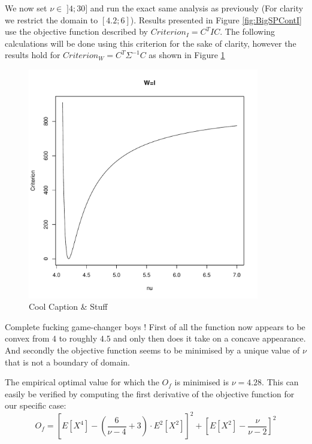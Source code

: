 We now set $\nu \in \; ]4;30]$ and run the exact same analysis as previously (For clarity we restrict the domain to $[4.2;6]$). Results presented in Figure \ref{fig:BigSPContI} use the objective function described by $Criterion_I = C^T I C$. The following calculations will be done using this criterion for the sake of clarity, however the results hold for $Criterion_W = C^T \Sigma^{-1} C$ as shown in Figure \ref{ConcavitySPI} \bigskip
\begin{figure}
    \centering
    \includegraphics[width=0.9\textwidth]{ConcavityS&PI.pdf}
    \caption{Cool Caption \& Stuff}
    \label{ConcavitySPI}
\end{figure}
\par
Complete fucking game-changer boys ! First of all the function now appears to be convex from $4$ to roughly $4.5$ and only then does it take on a concave appearance. And secondly the objective function seems to be minimised by a unique value of $\nu$ that is not a boundary of domain.
\par
The empirical optimal value for which the $O_f$ is minimised is $\nu=4.28$. 
This can easily be verified by computing the first derivative of the objective function for our specific case:
\begin{equation}\label{ObjectiveFunction_I}
    O_f = \left[E\left[X^4\right] - \left(\frac{6}{\nu-4}+3\right)\cdot         
                E^2\left[X^2\right]\right]^2 +
            \left[E\left[X^2\right] - \frac{\nu}{\nu - 2}\right]^2
\end{equation}

